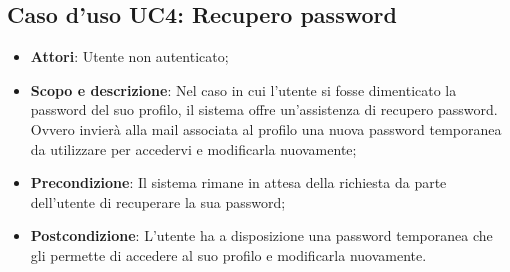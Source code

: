\documentclass[12pt,a4paper,titlepage]{article}
\begin{document}
	\subsection{Caso d'uso UC4: Recupero password}
	\label{UC4}
	\begin{itemize}
		\item \textbf{Attori}: Utente non autenticato;
		\item \textbf{Scopo e descrizione}: Nel caso in cui l'utente si fosse dimenticato la password del suo profilo, il sistema offre un'assistenza di recupero password. Ovvero invierà alla mail associata al profilo una nuova password temporanea da utilizzare per accedervi e modificarla nuovamente;
		\item \textbf{Precondizione}: Il sistema rimane in attesa della richiesta da parte dell'utente di recuperare la sua password;
		\item \textbf{Postcondizione}: L'utente ha a disposizione una password temporanea che gli permette di accedere al suo profilo e modificarla nuovamente.
	\end{itemize}
\end{document}
